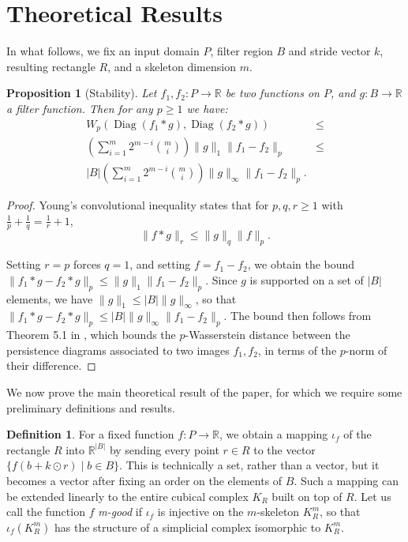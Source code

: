 \documentclass[conference]{IEEEtran}
\newtheorem{prop}[theorem]{Proposition}
\theoremstyle{definition}
\newtheorem{definition}[theorem]{Definition}
\numberwithin{figure}{section}
\begin{document}
\section{Theoretical Results}

In what follows, we fix an input domain $P$, filter region $B$ and stride vector $k$, resulting rectangle $R$, and a skeleton dimension $m$.

\begin{prop}[Stability]
	Let $f_1,f_2: P \to \mathbb{R}$ be two functions on $P$, and $g:B \to \mathbb{R}$ a filter function. Then for any $p\geq 1$ we have:
	\begin{align*}
	W_{p}(\operatorname{Diag}(f_1 \ast g),\operatorname{Diag}(f_2 \ast g)) & \leq\\ \left(\sum_{i=1}^{m} 2^{m-i} {m \choose i}\right)\|g\|_{1} \|f_1 - f_2\|_{p} & \leq\\ |B| \left(\sum_{i=1}^{m} 2^{m-i} {m \choose i}\right)\|g\|_{\infty} \|f_1 - f_2\|_{p}.
	\end{align*}
	
	
\end{prop}
\begin{proof}
	Young's convolutional inequality states that for $p,q,r \geq 1$ with $\frac{1}{p} + \frac{1}{q} = \frac{1}{r} + 1$,
	\[\|f \ast g\|_{r} \leq  \|g\|_{q} \|f\|_{p}.\]
	
	Setting $r=p$ forces $q=1$, and setting $f = f_1 - f_2$, we obtain the bound $\|f_1 \ast g - f_2 \ast g\|_{p} \leq \|g\|_{1}\|f_1 - f_2\|_{p}$. Since $g$ is supported on a set of $|B|$ elements, we have $\|g\|_{1} \leq |B|\|g\|_{\infty}$, so that $\|f_1 \ast g - f_2 \ast g\|_{p} \leq |B| \|g\|_{\infty}\|f_1 - f_2\|_{p}$. The bound then follows from Theorem 5.1 in \cite{skraba2020wasserstein}, which bounds the $p$-Wasserstein distance between the persistence diagrams associated to two images $f_1,f_2$, in terms of the $p$-norm of their difference.
\end{proof}

We now prove the main theoretical result of the paper, for which we require some preliminary definitions and results.

\begin{definition}
For a fixed function $f:P \to \mathbb{R}$, we obtain a mapping $\iota_{f}$ of the rectangle $R$ into $\mathbb{R}^{|B|}$ by sending every point $r \in R$ to the vector $\{f(b + k \odot r) \mid b \in B\}$. This is technically a set, rather than a vector, but it becomes a vector after fixing an order on the elements of $B$. Such a mapping can be extended linearly to the entire cubical complex $K_{R}$ built on top of $R$. Let us call the function $f$ \emph{m-good} if $\iota_{f}$ is injective on the $m$-skeleton $K_{R}^m$, so that $\iota_{f}(K_{R}^m)$ has the structure of a simplicial complex isomorphic to $K_{R}^m$.
\end{definition}
\end{document}
